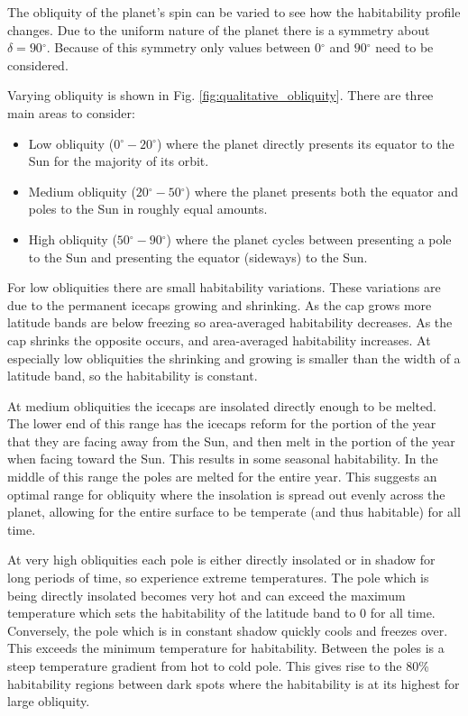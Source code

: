 \documentclass[12pt, onecolumn]{revtex4-2}    %
\newcommand{\degrees}{\ensuremath{^{\circ}}}
\begin{document}
The obliquity of the planet's spin can be varied to see how the habitability profile changes.
Due to the uniform nature of the planet there is a symmetry about $\delta = 90\degrees$.
Because of this symmetry only values between $0\degrees$ and $90\degrees$ need to be considered.

Varying obliquity is shown in Fig. \ref{fig:qualitative_obliquity}.
There are three main areas to consider:
\begin{itemize}
  \item Low obliquity ($0\degrees - 20\degrees$) where the planet directly presents its equator to the Sun for the majority of its orbit.
  \item Medium obliquity ($20\degrees - 50\degrees$) where the planet presents both the equator and poles to the Sun in roughly equal amounts.
  \item High obliquity ($50\degrees - 90\degrees$) where the planet cycles between presenting a pole to the Sun and presenting the equator (sideways) to the Sun.
\end{itemize}


For low obliquities there are small habitability variations.
These variations are due to the permanent icecaps growing and shrinking.
As the cap grows more latitude bands are below freezing so area-averaged habitability decreases.
As the cap shrinks the opposite occurs, and area-averaged habitability increases.
At especially low obliquities the shrinking and growing is smaller than the width of a latitude band, so the habitability is constant.


At medium obliquities the icecaps are insolated directly enough to be melted.
The lower end of this range has the icecaps reform for the portion of the year that they are facing away from the Sun, and then melt in the portion of the year when facing toward the Sun.
This results in some seasonal habitability.
In the middle of this range the poles are melted for the entire year.
This suggests an optimal range for obliquity where the insolation is spread out evenly across the planet, allowing for the entire surface to be temperate (and thus habitable) for all time.


At very high obliquities each pole is either directly insolated or in shadow for long periods of time, so experience extreme temperatures.
The pole which is being directly insolated becomes very hot and can exceed the maximum temperature which sets the habitability of the latitude band to 0 for all time.
Conversely, the pole which is in constant shadow quickly cools and freezes over. This exceeds the minimum temperature for habitability.
Between the poles is a steep temperature gradient from hot to cold pole.
This gives rise to the 80\% habitability regions between dark spots where the habitability is at its highest for large obliquity.
\end{document}
